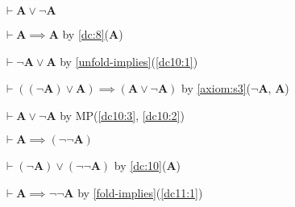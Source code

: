 \documentclass{amsart}%
\newcommand\metavariable[1]{\boldsymbol{#1}}
\begin{document}
\begin{dc}\label{dc:10}
$\vdash\metavariable{A}\lor\neg\metavariable{A}$
\end{dc}
\begin{pf}
\item\label{dc10:1} $\vdash\metavariable{A}\implies\metavariable{A}$
  by \ref{dc:8}($\metavariable{A}$)
\item\label{dc10:2} $\vdash\neg\metavariable{A}\lor\metavariable{A}$
  by \ref{unfold-implies}(\ref{dc10:1})
\item\label{dc10:3} $\vdash((\neg\metavariable{A})\lor\metavariable{A})\implies(\metavariable{A}\lor\neg\metavariable{A})$
  by \ref{axiom:s3}($\neg\metavariable{A}$, $\metavariable{A}$)
\item $\vdash\metavariable{A}\lor\neg\metavariable{A}$ by
  MP(\ref{dc10:3}, \ref{dc10:2})
\end{pf}

\begin{dc}\label{dc:11}
$\vdash\metavariable{A}\implies(\neg\neg\metavariable{A})$
\end{dc}
\begin{pf}
\item\label{dc11:1} $\vdash(\neg\metavariable{A})\lor(\neg\neg\metavariable{A})$
  by \ref{dc:10}($\metavariable{A}$)
\item $\vdash\metavariable{A}\implies\neg\neg\metavariable{A}$
  by \ref{fold-implies}(\ref{dc11:1})
\end{pf}
\end{document}
